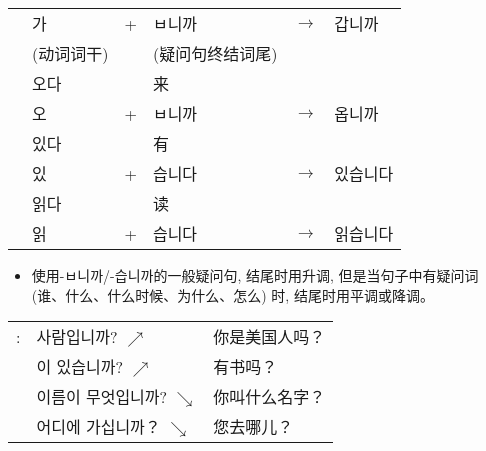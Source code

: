 \begin{grammar}
\begin{grammarsect}
\begin{tabular}{llllll}
            &\kr 가&+&\kr ㅂ니까&$\to$&\kr 갑니까\\
            &(动词词干)&&(疑问句终结词尾)\\
            &\kr 오다&&来\\
            &\kr 오&+&\kr ㅂ니까&$\to$&\kr 옵니까\\
            &\kr 있다&&有\\
            &\kr 있&+&\kr 습니다&$\to$&\kr 있습니다\\
            &\kr 읽다&&读\\
            &\kr 읽&+&\kr 습니다&$\to$&\kr 읽습니다\\
        \end{tabular}
    \end{grammarsect}
    \begin{itemize}
        \item 使用{\kr -ㅂ니까/-습니까}的一般疑问句, 结尾时用升调, 但是当句子中有疑问词 (谁、什么、什么时候、为什么、怎么) 时, 结尾时用平调或降调。
    \end{itemize}
    \begin{tabular}{lll}
            \kr \ruby{例}{예}:&\kr \ruby{美國}{미국} 사람입니까? $\nearrow$&你是美国人吗？\\
            &\kr \ruby{冊}{책}이 있습니까? $\nearrow$&有书吗？\\
            &\kr 이름이 무엇입니까? $\searrow$&你叫什么名字？\\
            &\kr 어디에 가십니까？ $\searrow$&您去哪儿？
        \end{tabular}\\
\end{grammar}
